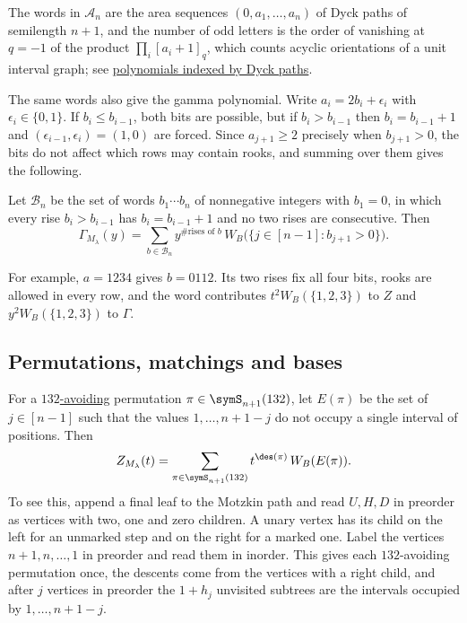 The words in $\mathcal{A}_n$ are the area sequences $(0,a_1,\dotsc,a_n)$ of
Dyck paths of semilength $n+1$, and the number of odd letters is the order of
vanishing at $q=-1$ of the product $\prod_i[a_i+1]_q$, which counts acyclic
orientations of a unit interval graph; see
\hyperref[dyckPathZPolynomials]{polynomials indexed by Dyck paths}.

The same words also give the gamma polynomial.  Write $a_i=2b_i+\epsilon_i$
with $\epsilon_i\in\{0,1\}$.  If $b_i\leq b_{i-1}$, both bits are possible, but
if $b_i>b_{i-1}$ then $b_i=b_{i-1}+1$ and $(\epsilon_{i-1},\epsilon_i)=(1,0)$
are forced.  Since $a_{j+1}\geq2$ precisely when $b_{j+1}>0$, the bits do not
affect which rows may contain rooks, and summing over them gives the
following.

\begin{corollary}[Alexandersson, 2026]
Let $\mathcal{B}_n$ be the set of words $b_1\dotsm b_n$ of nonnegative integers
with $b_1=0$, in which every rise $b_i>b_{i-1}$ has $b_i=b_{i-1}+1$ and no two
rises are consecutive.  Then
\[
  \Gamma_{M_\lambda}(y)=\sum_{b\in\mathcal{B}_n}
  y^{\#\text{rises of } b}\,
  W_B\bigl(\{j\in[n-1]:b_{j+1}>0\}\bigr).
\]
\end{corollary}

For example, $a=1234$ gives $b=0112$.  Its two rises fix all four bits, rooks
are allowed in every row, and the word contributes $t^2W_B(\{1,2,3\})$ to $Z$ and
$y^2W_B(\{1,2,3\})$ to $\Gamma$.


\subsection[schubertMatroidZPermutations]{Permutations, matchings and bases}

For a \hyperref[patternAvoidanceClasses]{$132$-avoiding} permutation
$\pi\in\symS_{n+1}(132)$, let $E(\pi)$ be the set of $j\in[n-1]$ such that the
values $1,\dotsc,n+1-j$ do not occupy a single interval of positions.  Then
\[
  Z_{M_\lambda}(t)=\sum_{\pi\in\symS_{n+1}(132)} t^{\des(\pi)}\,W_B(E(\pi)).
\]
To see this, append a final leaf to the Motzkin path and read $U,H,D$ in
preorder as vertices with two, one and zero children.  A unary vertex has its
child on the left for an unmarked step and on the right for a marked one.
Label the vertices $n+1,n,\dotsc,1$ in preorder and read them in inorder.  This
gives each $132$-avoiding permutation once, the descents come from the
vertices with a right child, and after $j$ vertices in preorder the $1+h_j$
unvisited subtrees are the intervals occupied by $1,\dotsc,n+1-j$.

